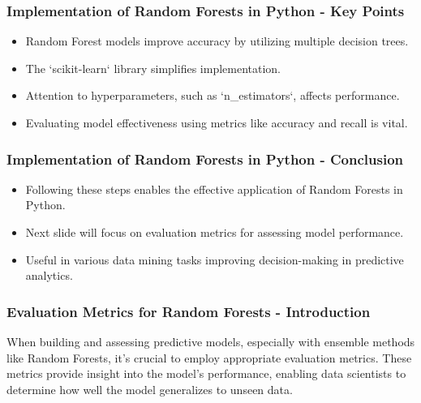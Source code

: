 \documentclass[aspectratio=169]{beamer}
\begin{document}
\begin{frame}
    \frametitle{Implementation of Random Forests in Python - Key Points}
    \begin{itemize}
        \item Random Forest models improve accuracy by utilizing multiple decision trees.
        \item The `scikit-learn` library simplifies implementation.
        \item Attention to hyperparameters, such as `n_estimators`, affects performance.
        \item Evaluating model effectiveness using metrics like accuracy and recall is vital.
    \end{itemize}
\end{frame}

\begin{frame}
    \frametitle{Implementation of Random Forests in Python - Conclusion}
    \begin{itemize}
        \item Following these steps enables the effective application of Random Forests in Python.
        \item Next slide will focus on evaluation metrics for assessing model performance.
        \item Useful in various data mining tasks improving decision-making in predictive analytics.
    \end{itemize}
\end{frame}

\begin{frame}
    \frametitle{Evaluation Metrics for Random Forests - Introduction}
    When building and assessing predictive models, especially with ensemble methods like Random Forests, it's crucial to employ appropriate evaluation metrics. These metrics provide insight into the model’s performance, enabling data scientists to determine how well the model generalizes to unseen data.
\end{frame}
\end{document}
